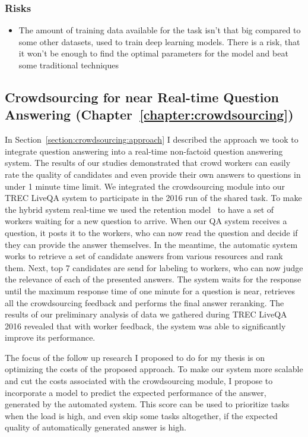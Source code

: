 \subsubsection{Risks}
\label{section:proposal:plan:non-factoid:risks}

\begin{itemize}
\item The amount of training data available for the task isn't that big compared to some other datasets, used to train deep learning models. There is a risk, that it won't be enough to find the optimal parameters for the model and beat some traditional techniques
\end{itemize}

\subsection{Crowdsourcing for near Real-time Question Answering (Chapter~\ref{chapter:crowdsourcing})}
\label{section:proposal:plan:crowdsourcing}

In Section~\ref{section:crowdsourcing:approach} I described the approach we took to integrate question answering into a real-time non-factoid question answering system.
The results of our studies demonstrated that crowd workers can easily rate the quality of candidates and even provide their own answers to questions in under 1 minute time limit.
We integrated the crowdsourcing module into our TREC LiveQA system to participate in the 2016 run of the shared task.
To make the hybrid system real-time we used the retention model~\cite{bernstein2011crowds} to have a set of workers waiting for a new question to arrive.
When our QA system receives a question, it posts it to the workers, who can now read the question and decide if they can provide the answer themselves.
In the meantime, the automatic system works to retrieve a set of candidate answers from various resources and rank them.
Next, top 7 candidates are send for labeling to workers, who can now judge the relevance of each of the presented answers.
The system waits for the response until the maximum response time of one minute for a question is near, retrieves all the crowdsourcing feedback and performs the final answer reranking.
The results of our preliminary analysis of data we gathered during TREC LiveQA 2016 revealed that with worker feedback, the system was able to significantly improve its performance.

The focus of the follow up research I proposed to do for my thesis is on optimizing the costs of the proposed approach.
To make our system more scalable and cut the costs associated with the crowdsourcing module, I propose to incorporate a model to predict the expected performance of the answer, generated by the automated system.
This score can be used to prioritize tasks when the load is high, and even skip some tasks altogether, if the expected quality of automatically generated answer is high.

